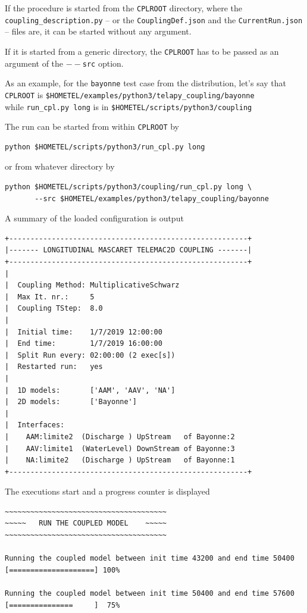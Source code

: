 If the procedure is started from the \texttt{CPLROOT}
directory, where the \texttt{coupling\_description.py} -- or the \texttt{CouplingDef.json} and the
\texttt{CurrentRun.json} -- files are, it can be started without any
argument.

If it is started from a generic directory, the \texttt{CPLROOT} has to
be passed as an argument of the \texttt{$--$src} option.
\newline

As an example, for the \texttt{bayonne} test case from the
distribution, let's say that\\
\texttt{CPLROOT} is \texttt{\$HOMETEL/examples/python3/telapy\_coupling/bayonne}\\
while
\texttt{run\_cpl.py long} is in
\texttt{\$HOMETEL/scripts/python3/coupling}

The run can be started from within \texttt{CPLROOT} by
\begin{verbatim}
python $HOMETEL/scripts/python3/run_cpl.py long
\end{verbatim}
or from whatever directory by
\begin{verbatim}
python $HOMETEL/scripts/python3/coupling/run_cpl.py long \
       --src $HOMETEL/examples/python3/telapy_coupling/bayonne
\end{verbatim}


A summary of the loaded configuration is output
\begin{verbatim}
+--------------------------------------------------------+
|------- LONGITUDINAL MASCARET TELEMAC2D COUPLING -------|
+--------------------------------------------------------+
|
|  Coupling Method: MultiplicativeSchwarz
|  Max It. nr.:     5
|  Coupling TStep:  8.0
|
|  Initial time:    1/7/2019 12:00:00
|  End time:        1/7/2019 16:00:00
|  Split Run every: 02:00:00 (2 exec[s])
|  Restarted run:   yes
|
|  1D models:       ['AAM', 'AAV', 'NA']
|  2D models:       ['Bayonne']
|
|  Interfaces:
|    AAM:limite2  (Discharge ) UpStream   of Bayonne:2
|    AAV:limite1  (WaterLevel) DownStream of Bayonne:3
|    NA:limite2   (Discharge ) UpStream   of Bayonne:1
+--------------------------------------------------------+
\end{verbatim}

The executions start and a progress counter is displayed
\begin{verbatim}
~~~~~~~~~~~~~~~~~~~~~~~~~~~~~~~~~~~~~~
~~~~~   RUN THE COUPLED MODEL    ~~~~~
~~~~~~~~~~~~~~~~~~~~~~~~~~~~~~~~~~~~~~

Running the coupled model between init time 43200 and end time 50400
[====================] 100%

Running the coupled model between init time 50400 and end time 57600
[===============     ]  75%
\end{verbatim}


